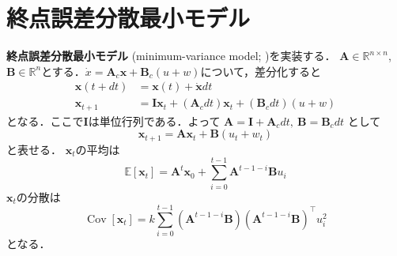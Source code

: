 \section{終点誤差分散最小モデル}
\textbf{終点誤差分散最小モデル} (minimum-variance model; \citep{Harris1998-gj})を実装する．
$\mathbf{A}\in \mathbb{R}^{n\times n}$, $\mathbf{B}\in \mathbb{R}^{n}$とする．$\dot{x}=\mathbf{A}_{c}\mathbf{x}+\mathbf{B}_{c}(u + w)$について，差分化すると
\begin{align}
\mathbf{x}(t+dt)&=\mathbf{x}(t)+\dot{\mathbf{x}}dt\\
\mathbf{x}_{t+1}&=\mathbf{I}\mathbf{x}_t+(\mathbf{A}_{c}dt)\mathbf{x}_t+(\mathbf{B}_{c}dt)(u + w)
\end{align}
となる．ここで$\mathbf{I}$は単位行列である．よって $\mathbf{A}=\mathbf{I}+\mathbf{A}_{c}dt,\ \mathbf{B}=\mathbf{B}_cdt$ として
\begin{equation}
\mathbf{x}_{t+1} = \mathbf{A} \mathbf{x}_t + \mathbf{B}(u_t + w_t)
\end{equation}
と表せる． $\mathbf{x}_t$の平均は
\begin{equation}
\mathbb{E}\left[\mathbf{x}_{t}\right]=\mathbf{A}^{t} \mathbf{x}_{0}+\sum_{i=0}^{t-1} \mathbf{A}^{t-1-i} \mathbf{B} u_{i}
\end{equation}
$\mathbf{x}_t$の分散は
\begin{equation}
\operatorname{Cov}\left[\mathbf{x}_{t}\right]=k \sum_{i=0}^{t-1}\left(\mathbf{A}^{t-1-i} \mathbf{B}\right)\left(\mathbf{A}^{t-1-i} \mathbf{B}\right)^{\top} u_{i}^{2}
\end{equation}
となる．

